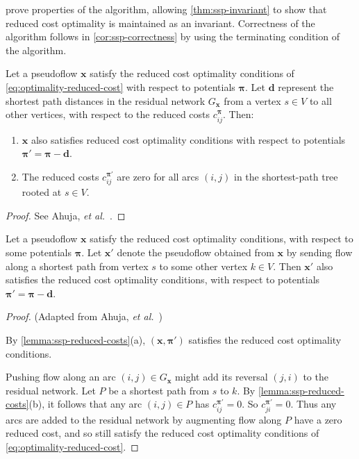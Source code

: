  prove properties of the algorithm, allowing \cref{thm:ssp-invariant} to show that reduced cost optimality is maintained as an invariant. Correctness of the algorithm follows in \cref{cor:ssp-correctness} by using the terminating condition of the algorithm.\\

\begin{lemma} \label{lemma:ssp-reduced-costs}
Let a pseudoflow $\mathbf{x}$ satisfy the reduced cost optimality conditions of \cref{eq:optimality-reduced-cost} with respect to potentials $\boldsymbol{\pi}$. Let $\mathbf{d}$ represent the shortest path distances in the residual network $G_{\mathbf{x}}$ from a vertex $s \in V$ to all other vertices, with respect to the reduced costs $c^{\boldsymbol{\pi}}_{ij}$. Then:
    
\begin{enumerate}[label=(\alph*)]
  \item $\mathbf{x}$ also satisfies reduced cost optimality conditions with respect to potentials $\boldsymbol{\pi}' = \boldsymbol{\pi} - \mathbf{d}$.
  \item The reduced costs $c^{\boldsymbol{\pi}'}_{ij}$ are zero for all arcs $(i,j)$ in the shortest-path tree rooted at $s \in V$.
\end{enumerate}
\end{lemma}
\begin{proof}
See Ahuja, \textit{et al.}~\cite[lemma~9.11]{Ahuja:1993}.
\end{proof}

\begin{cor} \label{cor:ssp-reduced-costs}
Let a pseudoflow $\mathbf{x}$ satisfy the reduced cost optimality conditions, with respect to some potentials $\boldsymbol{\pi}$. Let $\mathbf{x}'$ denote the pseudoflow obtained from $\mathbf{x}$ by sending flow along a shortest path from vertex $s$ to some other vertex $k \in V$. Then $\mathbf{x}'$ also satisfies the reduced cost optimality conditions, with respect to potentials $\boldsymbol{\pi}' = \boldsymbol{\pi} - \mathbf{d}$.
\end{cor}
\begin{proof} (Adapted from Ahuja, \textit{et al.}~\cite[lemma~9.12]{Ahuja:1993})
    
By \cref{lemma:ssp-reduced-costs}(a), $\left(\mathbf{x},\boldsymbol{\pi'}\right)$ satisfies the reduced cost optimality conditions.

Pushing flow along an arc $(i,j) \in G_{\mathbf{x}}$ might add its reversal $(j,i)$ to the residual network. Let $P$ be a shortest path from $s$ to $k$. By \cref{lemma:ssp-reduced-costs}(b), it follows that any arc $(i,j) \in P$ has $c^{\boldsymbol{\pi}'}_{ij} = 0$. So $c^{\boldsymbol{\pi}'}_{ji} = 0$. Thus any arcs are added to the residual network by augmenting flow along $P$ have a zero reduced cost, and so still satisfy the reduced cost optimality conditions of \cref{eq:optimality-reduced-cost}.
\end{proof}

